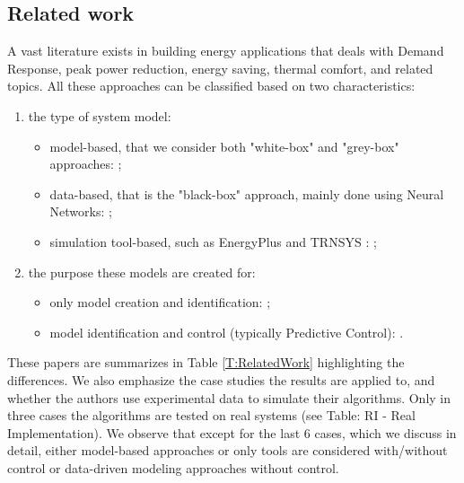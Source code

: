 \textcolor[rgb]{0,0,1}{
\subsection{Related work}
A vast literature exists in building energy applications that deals with Demand Response, peak power reduction, energy saving, thermal comfort, and related topics.
All these approaches can be classified based on two characteristics:
\begin{enumerate}
	\item the type of system model:
		\begin{itemize}
			\item model-based, that we consider both "white-box" and "grey-box" approaches: \cite{Shakouri2017SCS,Li2014EB,Yoon2014EB,Li2016AE,Harb2016EB,Salakij2016EB,Li2016E,Li2016EB,Hou2013,Cecconi2017EB};
			\item data-based, that is the "black-box" approach, mainly done using Neural Networks: \cite{Safa2017SCS,Neto2008EB,Magnier2010BE,Candanedo2017EB,Ascione2017E,Cecconi2017EB,Li2016AE};
			\item simulation tool-based, such as EnergyPlus \cite{energyPlus} and TRNSYS \cite{trnsys2000}: \cite{Yin2016EB,Christantoni2016EB};
		\end{itemize}
	\item the purpose these models are created for:
		\begin{itemize}
			\item only model creation and identification: \cite{Safa2017SCS,Neto2008EB,Magnier2010BE,Li2014EB,Li2016AE,Harb2016EB,Li2016EB,Candanedo2017EB,Cecconi2017EB,Ascione2017E};
			\item model identification and control (typically Predictive Control): \cite{Shakouri2017SCS,Yoon2014EB,Yin2016EB,Salakij2016EB,Li2016E,Hu2017AE}.
		\end{itemize}
\end{enumerate}
These papers are summarizes in Table \ref{T:RelatedWork} highlighting the differences.
We also emphasize the case studies the results are applied to, and whether the authors use experimental data to simulate their algorithms.
Only in three cases the algorithms are tested on real systems (see Table: RI - Real Implementation).
We observe that except for the last 6 cases, which we discuss in detail, either model-based approaches or only tools are considered with/without control or data-driven modeling approaches without control.
}
